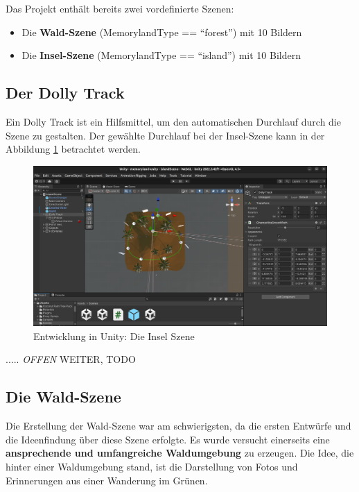 Das Projekt enthält bereits zwei vordefinierte Szenen:

\begin{itemize}
    \item Die \textbf{Wald-Szene} (MemorylandType == ``forest'') mit 10 Bildern
    \item Die \textbf{Insel-Szene} (MemorylandType == ``island'') mit 10 Bildern
\end{itemize}


\subsection{Der Dolly Track}
\label{subsec:unity-dolly-track}

Ein Dolly Track ist ein Hilfsmittel, um den automatischen Durchlauf durch die Szene zu gestalten. Der gewählte Durchlauf bei der Insel-Szene kann in der Abbildung \ref{fig:unity-dolly-track} betrachtet werden.


\begin{figure} [h t]
    \centering
    \includegraphics[scale=0.15]{pics/unity-dolly-track.png}
    \caption{Entwicklung in Unity: Die Insel Szene}
    \label{fig:unity-dolly-track}
\end{figure}



..... \emph{OFFEN} WEITER, TODO





\subsection{Die Wald-Szene}

Die Erstellung der Wald-Szene war am schwierigsten, da die ersten Entwürfe und die Ideenfindung über diese Szene erfolgte. Es wurde versucht einerseits eine \textbf{ansprechende und umfangreiche Waldumgebung} zu erzeugen. Die Idee, die hinter einer Waldumgebung stand, ist die Darstellung von Fotos und Erinnerungen aus einer Wanderung im Grünen.



